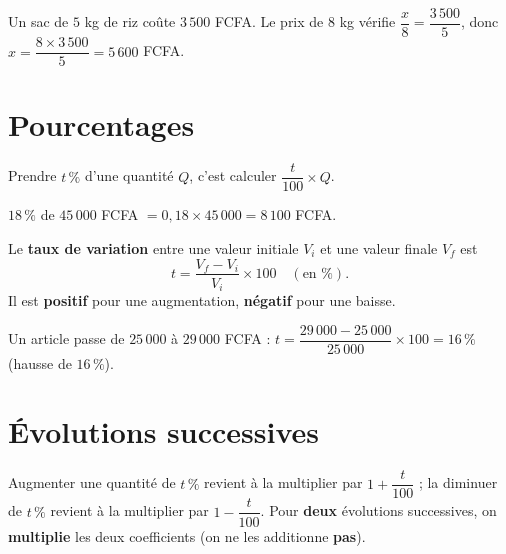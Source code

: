 \begin{exemple}
Un sac de $5$ kg de riz coûte $3\,500$ FCFA. Le prix de $8$ kg vérifie
$\dfrac x8=\dfrac{3\,500}5$, donc $x=\dfrac{8\times3\,500}5=5\,600$ FCFA.
\end{exemple}

\section{Pourcentages}

\begin{definition}[Pourcentage]
Prendre $t\,\%$ d'une quantité $Q$, c'est calculer $\dfrac t{100}\times Q$.
\end{definition}

\begin{illus}
\end{illus}

\begin{exemple}
$18\,\%$ de $45\,000$ FCFA $=0{,}18\times45\,000=8\,100$ FCFA.
\end{exemple}

\begin{propriete}
Le \textbf{taux de variation} entre une valeur initiale $V_i$ et une valeur finale $V_f$ est
\[
t=\frac{V_f-V_i}{V_i}\times100 \quad(\text{en }\%).
\]
Il est \textbf{positif} pour une augmentation, \textbf{négatif} pour une baisse.
\end{propriete}

\begin{exemple}
Un article passe de $25\,000$ à $29\,000$ FCFA : $t=\dfrac{29\,000-25\,000}{25\,000}\times100=16\,\%$
(hausse de $16\,\%$).
\end{exemple}

\section{Évolutions successives}

\begin{propriete}
Augmenter une quantité de $t\,\%$ revient à la multiplier par $1+\dfrac t{100}$ ; la
diminuer de $t\,\%$ revient à la multiplier par $1-\dfrac t{100}$. Pour \textbf{deux}
évolutions successives, on \textbf{multiplie} les deux coefficients (on ne les additionne
\textbf{pas}).
\end{propriete}

